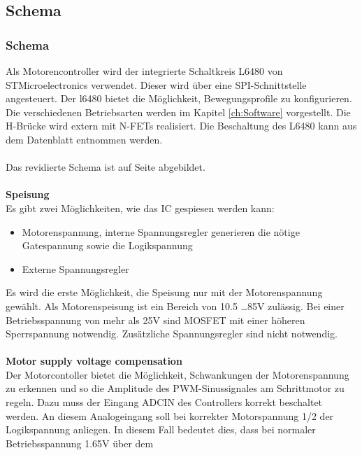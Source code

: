     \subsection{Schema} \label{sec:Schema}
    \fi
    \ifEMBED
    \subsubsection{Schema} \label{sec:Schema}
    \fi
    Als Motorencontroller wird der integrierte Schaltkreis L6480 von 
    STMicroelectronics verwendet. Dieser wird über eine SPI-Schnittstelle 
    angesteuert. Der l6480 bietet die Möglichkeit, Bewegungsprofile zu 
    konfigurieren. Die verschiedenen Betriebsarten werden im Kapitel 
    \ref{ch:Software} vorgestellt. Die H-Brücke wird extern mit N-FETs 
    realisiert. Die Beschaltung des L6480 kann aus dem Datenblatt 
    \cite{Datasheet:L6480} entnommen werden.\\\\ 
    Das revidierte Schema ist auf Seite \pageref{Schema} abgebildet.
    \\\\
    \textbf{Speisung}\\
    Es gibt zwei Möglichkeiten, wie das IC gespiesen werden kann: 
    \begin{itemize}
        \item Motorenspannung, interne Spannungsregler generieren die nötige 
            Gatespannung sowie die Logikspannung
        \item Externe Spannungsregler
    \end{itemize}
    Es wird die erste Möglichkeit, die Speisung nur mit der Motorenspannung 
    gewählt. Als Motorenspeisung ist ein Bereich von 10.5 \ldots 85\si{\volt} 
    zulässig. Bei einer Betriebsspannung von mehr als 25\si{\volt} sind MOSFET 
    mit einer höheren Sperrspannung notwendig. Zusätzliche Spannungsregler 
    sind nicht notwendig. 
    \\\\
    \textbf{Motor supply voltage compensation}\\
    Der Motorcontoller bietet die Möglichkeit, Schwankungen der 
    Motorenspannung zu erkennen und so die Amplitude des PWM-Sinussignales am 
    Schrittmotor zu regeln. Dazu muss der Eingang ADCIN des Controllers 
    korrekt beschaltet werden. An diesem Analogeingang soll bei korrekter 
    Motorspannung 1/2 der Logikspannung anliegen. In diesem Fall bedeutet 
    dies, dass bei normaler Betriebsspannung 1.65\si{\volt} über dem 
